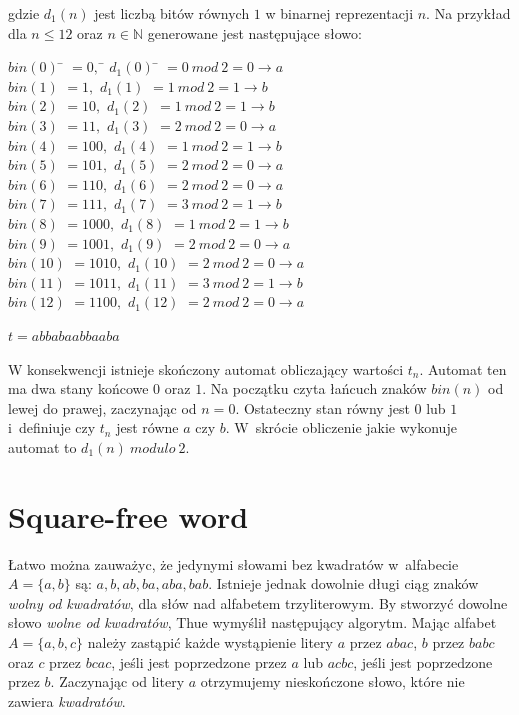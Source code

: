 \documentclass[document]{xmgr}
\begin{document}
\noindent gdzie $d_1(n)$ jest liczbą bitów równych $1$ w binarnej reprezentacji $n$. Na przykład dla $n \leq 12$ oraz $n \in \mathbb{N}$ generowane jest następujące słowo:

\begin{tabbing}
\centering
$bin(0)$\hspace{1em} \= $= 0,$\hspace{7em} \= $d_1 (0)$\hspace{1em} \= $= 0\ mod\ 2 = 0 \to a$ \\
$bin(1)$ \> $= 1,$ \> $d_1 (1)$ \> $= 1\ mod\ 2 = 1 \to b$\\
$bin(2)$ \> $= 10,$ \> $d_1 (2)$ \> $= 1\ mod\ 2 = 1 \to b$\\
$bin(3)$ \> $= 11,$ \> $d_1 (3)$ \> $= 2\ mod\ 2 = 0 \to a$\\
$bin(4)$ \> $= 100,$ \> $d_1 (4)$ \> $= 1\ mod\ 2 = 1 \to b$\\
$bin(5)$ \> $= 101,$ \> $d_1 (5)$ \> $= 2\ mod\ 2 = 0 \to a$\\
$bin(6)$ \> $= 110,$ \> $d_1 (6)$ \> $= 2\ mod\ 2 = 0 \to a$\\
$bin(7)$ \> $= 111,$ \> $d_1 (7)$ \> $= 3\ mod\ 2 = 1 \to b$\\
$bin(8)$ \> $= 1000,$ \> $d_1 (8)$ \> $= 1\ mod\ 2 = 1 \to b$\\
$bin(9)$ \> $= 1001,$ \> $d_1 (9)$ \> $= 2\ mod\ 2 = 0 \to a$\\
$bin(10)$ \> $= 1010,$	\> $d_1 (10)$ \> $= 2\ mod\ 2 = 0 \to a$\\
$bin(11)$ \> $= 1011,$ 	\> $d_1 (11)$ \> $= 3\ mod\ 2 = 1 \to b$\\
$bin(12)$ \> $= 1100,$ 	\> $d_1 (12)$ \> $= 2\ mod\ 2 = 0 \to a$
\end{tabbing}

{\centering $t = abbabaabbaaba$ \par}

W konsekwencji istnieje skończony automat obliczający wartości $t_n$. Automat ten ma dwa stany końcowe $0$ oraz $1$. Na początku czyta łańcuch znaków $bin(n)$ od lewej do prawej, zaczynając od $n=0$. Ostateczny stan równy jest $0$ lub $1$ i~definiuje czy $t_n$ jest równe $a$ czy $b$. W~skrócie obliczenie jakie wykonuje automat to $d_1(n)\ modulo\ 2$.


\section{Square-free word}
Łatwo można zauważyc, że jedynymi słowami bez kwadratów w~alfabecie $A = \{a, b\}$ są: $a, b, ab, ba, aba, bab$. Istnieje jednak dowolnie długi ciąg znaków \emph{wolny od kwadratów}, dla słów nad alfabetem trzyliterowym. By stworzyć dowolne słowo \emph{wolne od kwadratów}, Thue wymyślił następujący algorytm. Mając alfabet $A = \{a, b, c\}$ należy zastąpić każde wystąpienie litery $a$ przez $abac$,  $b$ przez $babc$ oraz $c$ przez $bcac$, jeśli jest poprzedzone przez $a$ lub $acbc$, jeśli jest poprzedzone przez $b$. Zaczynając od litery $a$ otrzymujemy nieskończone słowo, które nie zawiera \emph{kwadratów}.
\end{document}
